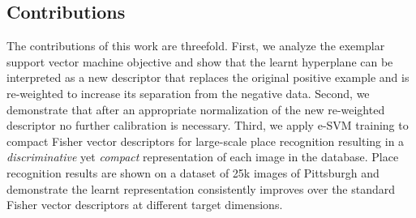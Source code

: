 \documentclass[table]{article} %
\begin{document}
\vspace{-3mm}
\subsection*{Contributions} \vspace{-3mm}
    The contributions of this work are threefold.
    First, we analyze the exemplar support vector machine objective and show that the learnt hyperplane can be interpreted
    as a new descriptor that replaces the original positive example and is re-weighted to increase its separation from the negative data.
    Second, we demonstrate that after an appropriate normalization of the new re-weighted descriptor no further calibration is necessary. 
    Third, we apply e-SVM training to compact Fisher vector descriptors for large-scale place recognition resulting in  
    a {\em discriminative} yet {\em compact} representation of each image in the database. 
    Place recognition results are shown on a dataset of 25k images of Pittsburgh and demonstrate the learnt representation
    consistently improves over the standard Fisher vector descriptors at different target dimensions. %
\end{document}
